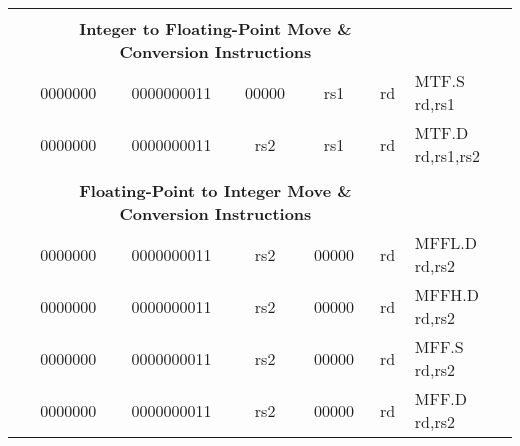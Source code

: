 \begin{table}[p]
\begin{small}
\begin{center}
\begin{tabular}{rcccccccccl}
&
\multicolumn{9}{c}{} & \\
&
\multicolumn{9}{c}{\bf Integer to Floating-Point Move \& Conversion Instructions} & \\
\cline{2-10}
  

&
\multicolumn{1}{|c|}{0000000} &
\multicolumn{5}{c|}{0000000011} &
\multicolumn{1}{c|}{00000} &
\multicolumn{1}{c|}{rs1} &
\multicolumn{1}{c|}{rd} & MTF.S rd,rs1 \\
\cline{2-10}
  

&
\multicolumn{1}{|c|}{0000000} &
\multicolumn{5}{c|}{0000000011} &
\multicolumn{1}{c|}{rs2} &
\multicolumn{1}{c|}{rs1} &
\multicolumn{1}{c|}{rd} & MTF.D rd,rs1,rs2 \\
\cline{2-10}
  

&
\multicolumn{9}{c}{} & \\
&
\multicolumn{9}{c}{\bf Floating-Point to Integer Move \& Conversion Instructions} & \\
\cline{2-10}
  

&
\multicolumn{1}{|c|}{0000000} &
\multicolumn{5}{c|}{0000000011} &
\multicolumn{1}{c|}{rs2} &
\multicolumn{1}{c|}{00000} &
\multicolumn{1}{c|}{rd} & MFFL.D rd,rs2 \\
\cline{2-10}
  

&
\multicolumn{1}{|c|}{0000000} &
\multicolumn{5}{c|}{0000000011} &
\multicolumn{1}{c|}{rs2} &
\multicolumn{1}{c|}{00000} &
\multicolumn{1}{c|}{rd} & MFFH.D rd,rs2 \\
\cline{2-10}
  

&
\multicolumn{1}{|c|}{0000000} &
\multicolumn{5}{c|}{0000000011} &
\multicolumn{1}{c|}{rs2} &
\multicolumn{1}{c|}{00000} &
\multicolumn{1}{c|}{rd} & MFF.S rd,rs2 \\
\cline{2-10}
  

&
\multicolumn{1}{|c|}{0000000} &
\multicolumn{5}{c|}{0000000011} &
\multicolumn{1}{c|}{rs2} &
\multicolumn{1}{c|}{00000} &
\multicolumn{1}{c|}{rd} & MFF.D rd,rs2 \\
\cline{2-10}
  

\end{tabular}
\end{center}
\end{small}

\label{instr-table}
\end{table}
  

\newpage

